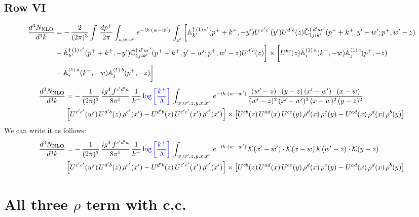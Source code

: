 \documentclass[9pt]{article}
\def\mf#1{\mathbb{#1}}
\numberwithin{equation}{section}
\begin{document}
\subsection{Row VI}
\begin{align}
     \frac{d^{3}N_{\rm NLO}}{d^{3}k} & =   -\,\frac{2}{(2\pi)^{3}} \int\, \frac{dp^{+}}{2\pi}\int_{z,w,w^{\prime}} e^{-ik\cdot (w-w')}\, \int_{y^{\prime}}\bigg[\mf{A}^{\dagger\, (1)\,e^{\prime}}_{k^{\prime}}(p^{+}+k^{+},-y^{\prime})U^{\, e^{\prime}c^{\prime}}(y^{\prime})U^{d^{\prime}b}(z) \Bar{\mf{C}}^{\dagger\, d^{\prime}ac^{\prime}}_{1jik^{\prime}}(p^{+}+k^{+},y^{\prime}-w^{\prime}; p^{+},w^{\prime}-z) \notag \\ & -\Bar{\mf{A}}^{\dagger\, (1)\,c^{\prime}}_{k^{\prime}}(p^{+}+k^{+},-y^{\prime})\Bar{\mf{C}}^{\dagger\, d^{\prime}ac^{\prime}}_{1jik^{\prime}}(p^{+}+k^{+},y^{\prime}-w^{\prime}; p^{+},w^{\prime}-z)U^{d^{\prime}b}(z)\bigg] \times \bigg[U^{bc}(z)\Bar{\mf{A}}^{(1)\, a}_{i}(k^{+},- w)\Bar{\mf{A}}^{(1)\, c}_{j}(p^{+},-z)\notag \\ & -\Bar{\mf{A}}^{(1)\, a}_{i}(k^{+},- w) \mf{A}^{(1)\, b}_{j}(p^{+},- z)\bigg]\nonumber
\end{align}
\begin{align}
    \frac{d^{3}N_{\rm NLO}}{d^{3}k} & = -\,\frac{1}{(2\pi)^{3}}\, \frac{ig^{4}\,f^{c'd'a}}{8\pi^{5}}\, \frac{1}{k^{+}}\,{\color{blue}\log{\left[\frac{k^{+}}{\Lambda}\right]}}\, \int_{w,w',z,y,x,x'}\, e^{-ik\cdot (w-w')}\,\frac{(w'-z)\cdot (y-z)\,(x'-w')\cdot (x-w)}{(w'-z)^{2}\,(x'-w')^{2}\,(x-w)^{2}\,(y-z)^{2}}\notag \\ & \left[U^{c'e'}(w')\,U^{d'b}(z)\,\rho^{e'}(x')-U^{d'b}(z)\,U^{c'e'}(x')\,\rho^{e'}(x')\right]\times  \left[U^{cb}(z)\,U^{ad}(x)\,U^{ce}(y)\,\rho^{d}(x)\,\rho^{e}(y)-U^{ad}(x)\,\rho^{d}(x)\,\rho^{b}(y)\right]
\end{align}
We can write it as follows:
\begin{align}
    \frac{d^{3}N_{\rm NLO}}{d^{3}k} & = -\,\frac{1}{(2\pi)^{3}}\, \frac{ig^{4}\,f^{c'd'a}}{8\pi^{5}}\, \frac{1}{k^{+}}\,{\color{blue}\log{\left[\frac{k^{+}}{\Lambda}\right]}}\, \int_{w,w',z,y,x,x'}\, e^{-ik\cdot (w-w')}\,\mathcal{K}(x'-w')\cdot \mathcal{K}(x-w)\,\mathcal{K}(w'-z)\cdot \mathcal{K}(y-z)\notag \\ & \left[U^{c'e'}(w')\,U^{d'b}(z)\,\rho^{e'}(x')-U^{d'b}(z)\,U^{c'e'}(x')\,\rho^{e'}(x')\right]\times  \left[U^{cb}(z)\,U^{ad}(x)\,U^{ce}(y)\,\rho^{d}(x)\,\rho^{e}(y)-U^{ad}(x)\,\rho^{d}(x)\,\rho^{b}(y)\right]
\end{align}
\section{All three $\rho$ term with c.c.}
\end{document}
